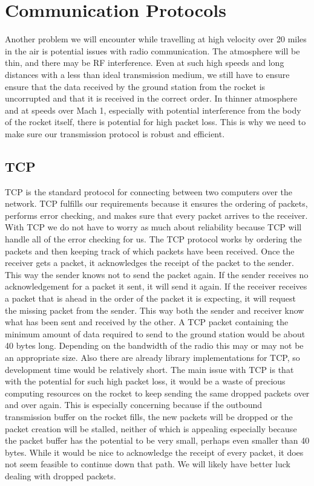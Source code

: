 \documentclass[onecolumn, draftclsnofoot,10pt, compsoc]{IEEEtran}
\begin{document}
\section{Communication Protocols}
Another problem we will encounter while travelling at high velocity over 20 miles in the air is potential issues with radio communication.
The atmosphere will be thin, and there may be RF interference.
Even at such high speeds and long distances with a less than ideal transmission medium, we still have to ensure ensure that the data received by the ground station from the rocket is uncorrupted and that it is received in the correct order.
In thinner atmosphere and at speeds over Mach 1, especially with potential interference from the body of the rocket itself, there is potential for high packet loss.
This is why we need to make sure our transmission protocol is robust and efficient.

\subsection{TCP}
TCP is the standard protocol for connecting between two computers over the network.
TCP fulfills our requirements because it ensures the ordering of packets, performs error checking, and makes sure that every packet arrives to the receiver.
With TCP we do not have to worry as much about reliability because TCP will handle all of the error checking for us.
The TCP protocol works by ordering the packets and then keeping track of which packets have been received.
Once the receiver gets a packet, it acknowledges the receipt of the packet to the sender.
This way the sender knows not to send the packet again.
If the sender receives no acknowledgement for a packet it sent, it will send it again.
If the receiver receives a packet that is ahead in the order of the packet it is expecting, it will request the missing packet from the sender.
This way both the sender and receiver know what has been sent and received by the other.
A TCP packet containing the minimum amount of data required to send to the ground station would be about 40 bytes long.
Depending on the bandwidth of the radio this may or may not be an appropriate size.
Also there are already library implementations for TCP, so development time would be relatively short.
The main issue with TCP is that with the potential for such high packet loss, it would be a waste of precious computing resources on the rocket to keep sending the same dropped packets over and over again.
This is especially concerning because if the outbound transmission buffer on the rocket fills, the new packets will be dropped or the packet creation will be stalled, neither of which is appealing especially because the packet buffer has the potential to be very small, perhaps even smaller than 40 bytes.
While it would be nice to acknowledge the receipt of every packet, it does not seem feasible to continue down that path.
We will likely have better luck dealing with dropped packets.
\end{document}
